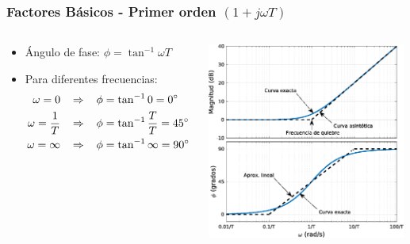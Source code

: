 \documentclass[aspectratio=169, handout]{beamer}
\theoremstyle{definition}
\theoremstyle{plain}
\theoremstyle{remark}
\begin{document}
\begin{frame}[<+->]\frametitle{Factores Básicos - Primer orden $(1+j \omega T)$}
\vspace*{8mm}
\begin{columns}
	\begin{column}{0.5\textwidth}
	\small
	\begin{itemize}
		\item Ángulo de fase: $\phi = \tan^{-1} \omega T$
		\item Para diferentes frecuencias:
		\begin{align*}
			\omega = 0 \hspace*{3mm} &\Rightarrow \hspace*{3mm} \phi = \tan^{-1} 0 = \ang{0}\\
			\omega = \frac{1}{T} \hspace*{3mm} &\Rightarrow \hspace*{3mm} \phi = \tan^{-1}\frac{T}{T} = \ang{45}\\
			\omega = \infty \hspace*{3mm} &\Rightarrow \hspace*{3mm} \phi =  \tan^{-1} \infty = \ang{90}
		\end{align*}
	\end{itemize}
	\end{column}
	\begin{column}{0.5\textwidth}
	\centering
	\includegraphics[width=6.5cm]{images/bodeFirstOrderDerivative.eps}
	\end{column}
\end{columns}
\end{frame}
\end{document}
